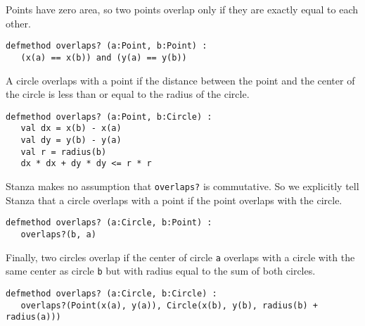 \documentclass[10pt,oneside]{book}
\begin{document}
Points have zero area, so two points overlap only if they are exactly equal to each other. 
\begin{lstlisting}
defmethod overlaps? (a:Point, b:Point) :
   (x(a) == x(b)) and (y(a) == y(b))
\end{lstlisting}

A circle overlaps with a point if the distance between the point and the center of the circle is less than or equal to the radius of the circle.
\begin{lstlisting}
defmethod overlaps? (a:Point, b:Circle) :
   val dx = x(b) - x(a)
   val dy = y(b) - y(a)
   val r = radius(b)
   dx * dx + dy * dy <= r * r
\end{lstlisting}

Stanza makes no assumption that \texttt{\frenchspacing overlaps?} is commutative. So we explicitly tell Stanza that a circle overlaps with a point if the point overlaps with the circle.
\begin{lstlisting}
defmethod overlaps? (a:Circle, b:Point) :
   overlaps?(b, a)
\end{lstlisting}

Finally, two circles overlap if the center of circle \texttt{\frenchspacing a} overlaps with a circle with the same center as circle \texttt{\frenchspacing b} but with radius equal to the sum of both circles.
\begin{lstlisting}
defmethod overlaps? (a:Circle, b:Circle) :
   overlaps?(Point(x(a), y(a)), Circle(x(b), y(b), radius(b) + radius(a)))
\end{lstlisting}
\end{document}
